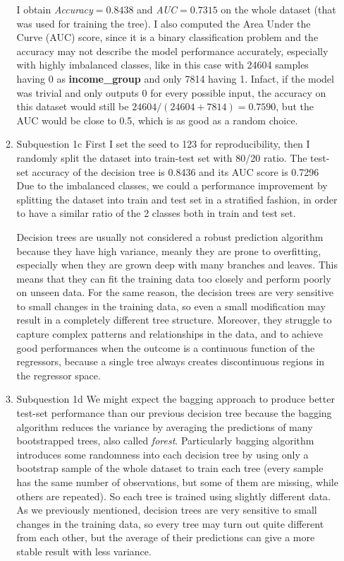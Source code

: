 \documentclass[12pt,twoside]{article}
\begin{document}
\begin{enumerate}
\begin{enumerate}
	I obtain \textit{Accuracy}$=0.8438$ and \textit{AUC}$=0.7315$ on the whole dataset (that was used for training the tree).  I also computed the Area Under the Curve (AUC) score, since it is a binary classification problem and the accuracy may not describe the model performance accurately, especially with highly imbalanced classes, like in this case with 24604 samples having 0 as \textbf{income\_group} and only 7814 having 1.
	Infact, if the model was trivial and only outputs 0 for every possible input, the accuracy on this dataset would still be $24604/(24604+7814)=0.7590$, but the AUC would be close to 0.5, which is as good as a random choice.
	
	\item Subquestion 1c First I set the seed to 123 for reproducibility, then I randomly split the dataset into train-test set with 80/20 ratio. The test-set accuracy of the decision tree is 0.8436 and its AUC score is 0.7296
	Due to the imbalanced classes, we could a performance improvement by splitting the dataset into train and test set in a stratified fashion, in order to have a similar ratio of the 2 classes both in train and test set.

	Decision trees are usually not considered a robust prediction algorithm because they have high variance, meanly they are prone to overfitting, especially when they are grown deep with many branches and leaves. This means that they can fit the training data too closely and perform poorly on unseen data. 
	For the same reason, the decision trees are very sensitive to small changes in the training data, so even a small modification may result in a completely different tree structure. Moreover, they struggle to capture complex patterns and relationships in the data, and to achieve good performances when the outcome is a continuous function of the regressors, because a single tree always creates discontinuous regions in the regressor space.
	
	\item Subquestion 1d 
	We might expect the bagging approach to produce better test-set performance than our previous decision tree because the bagging algorithm reduces the variance by averaging the predictions of many bootstrapped trees, also called \textit{forest}. Particularly bagging algorithm introduces some randomness into each decision tree by using only a bootstrap sample of the whole dataset to train each tree (every sample has the same number of observations, but some of them are missing, while others are repeated). So each tree is trained using slightly different data. 
	As we previously mentioned, decision trees are very sensitive to small changes in the training data, so every tree may turn out quite different from each other, but the average of their predictions can give a more stable result with less variance.
	

\end{enumerate}
\end{enumerate}
\end{document}

